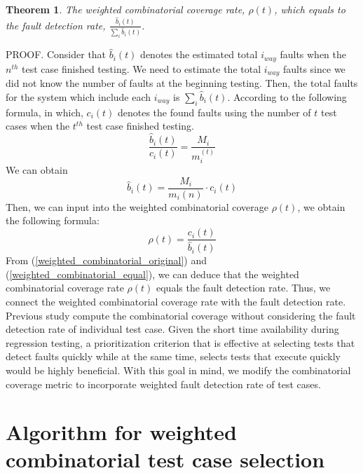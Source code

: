 \documentclass[10pt,conference, compsocconf]{IEEEtran}
\newtheorem{thm}{Theorem}[section]
\begin{document}
\begin{CJK}{UTF8}{gkai}
\begin{thm}
The weighted combinatorial coverage rate, $\rho(t)$, which equals to the fault detection rate,
$\frac{\hat{b}_i(t)}{\sum_i{\hat{b}_i(t)}}$.
\end{thm}

PROOF. Consider that $\hat{b}_i(t)$ denotes the estimated total $i_{way}$ faults when the $n^{th}$ 
test case finished testing. We need to estimate the total $i_{way}$ faults since we did not know 
the number of faults at the beginning testing.
Then, the total faults for the system which include each $i_{way}$ is $\sum_i{\hat{b}_i(t)}$. 
According to the following formula, in which, $c_i(t)$ denotes the found faults using the 
number of $t$ test cases when the $t^{th}$ test case finished testing.
\begin{equation}
\label{fault_combination}
\frac{\hat{b}_i(t)}{c_i(t)}=\frac{M_i}{m_i^(t)}
\end{equation}
We can obtain
\begin{equation}
\label{estimate}
\hat{b}_i(t)=\frac{M_i}{m_i(n)}\cdot{c_i(t)}
\end{equation}
Then, we can input \label{estimate} into the weighted combinatorial coverage $\rho(t)$,
we obtain the following formula:
\begin{equation}
\label{weighted_combinatorial_equal}
\rho(t)=\frac{c_i(t)}{\hat{b}_i(t)}
\end{equation}
From (\ref{weighted_combinatorial_original}) and (\ref{weighted_combinatorial_equal}), 
we can deduce that the weighted combinatorial coverage rate $\rho(t)$ equals the
fault detection rate. Thus, we connect the weighted combinatorial coverage rate with
the fault detection rate.
Previous study compute the combinatorial coverage without considering the fault detection rate of individual test case. 
Given the short time availability during regression testing, a prioritization criterion that
is effective at selecting tests that detect faults quickly while at the same time, selects
tests that execute quickly would be highly beneficial. With this goal in mind, we modify the combinatorial
coverage metric to incorporate weighted fault detection rate of test cases. 

\section{Algorithm for weighted combinatorial test case selection}
\label{sec:algorithm}

\end{CJK}
\end{document}
